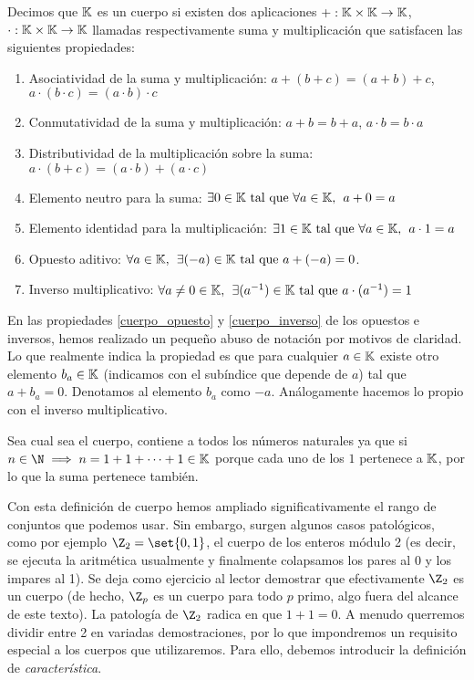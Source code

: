 \documentclass[../algebra_lineal.tex]{subfiles}
\begin{document}
\begin{definition}[Cuerpo]
    Decimos que $\mathbb{K}$ es un cuerpo si existen dos aplicaciones $+:\mathbb{K} \times \mathbb{K} \to \mathbb{K}$, $\cdot:\mathbb{K} \times \mathbb{K} \to \mathbb{K}$ llamadas respectivamente suma y multiplicación que satisfacen las siguientes propiedades:
    \begin{enumerate}
        \item Asociatividad de la suma y multiplicación: $a+(b+c)=(a+b)+c$, $a\cdot(b\cdot c)=(a\cdot b)\cdot c$
        \item Conmutatividad de la suma y multiplicación: $a+b=b+a$, $a\cdot b = b \cdot a$
        \item Distributividad de la multiplicación sobre la suma: $a \cdot (b+c) = (a \cdot b) + (a \cdot c)$
        \item Elemento neutro para la suma: $\exists 0 \in \mathbb{K} \mathrm{\,\, tal \,\, que \,\,} \forall a \in \mathbb{K}, \hspace{1.5mm} a+0=a$
        \item Elemento identidad para la multiplicación:  $\exists 1 \in \mathbb{K} \mathrm{\,\, tal \,\, que \,\,} \forall a \in \mathbb{K}, \hspace{1.5mm} a\cdot 1=a$
        \item \label{cuerpo_opuesto} Opuesto aditivo: $\forall a \in \mathbb{K}, \hspace{1.5mm} \exists {(-a)} \in \mathbb{K} \mathrm{\,\, tal \,\, que \,\,} a + (-a) = 0 $.
        \item \label{cuerpo_inverso} Inverso multiplicativo: $\forall a \neq 0 \in \mathbb{K}, \hspace{1.5mm} \exists {(a^{-1})} \in \mathbb{K} \mathrm{\,\, tal \,\, que \,\,} a \cdot (a^{-1}) = 1$
    \end{enumerate}    
\end{definition}

\begin{notation}
    En las propiedades \ref{cuerpo_opuesto} y \ref{cuerpo_inverso} de los opuestos e inversos, hemos realizado un pequeño abuso de notación por motivos de claridad. Lo que realmente indica la propiedad es que para cualquier $a \in \mathbb{K}$ existe otro elemento $b_a \in \mathbb{K}$ (indicamos con el subíndice que depende de $a$) tal que $a + b_a = 0$. Denotamos al elemento $b_a$ como $-a$. Análogamente hacemos lo propio con el inverso multiplicativo. 
\end{notation}

\begin{remark}
    Sea cual sea el cuerpo, contiene a todos los números naturales ya que si $n \in \N \implies n = 1 + 1 + \dots + 1 \in \K$ porque cada uno de los $1$ pertenece a $\mathbb{K}$, por lo que la suma pertenece también.
\end{remark}

Con esta definición de cuerpo hemos ampliado significativamente el rango de conjuntos que podemos usar. Sin embargo, surgen algunos casos patológicos, como por ejemplo $\Z_2 = \set{0, 1}$, el cuerpo de los enteros módulo 2 (es decir, se ejecuta la aritmética usualmente y finalmente colapsamos los pares al 0 y los impares al 1). Se deja como ejercicio al lector demostrar que efectivamente $\Z_2$ es un cuerpo (de hecho, $\Z_p$ es un cuerpo para todo $p$ primo, algo fuera del alcance de este texto). La patología de $\Z_2$ radica en que $1+1=0$. A menudo querremos dividir entre 2 en variadas demostraciones, por lo que impondremos un requisito especial a los cuerpos que utilizaremos. Para ello, debemos introducir la definición de \textit{característica}.
\end{document}
